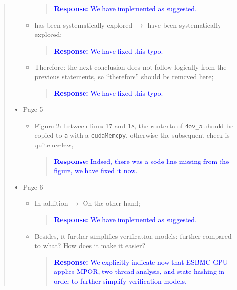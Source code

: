 \documentclass[11pt]{article}
\begin{document}
\begin{quote}
\begin{itemize}
\begin{itemize}
    \begin{quote}
    \textcolor{blue}{\textbf{Response:} We have implemented as suggested.}
    \end{quote}

  \item has been systematically explored $\rightarrow$ have been systematically explored;
  
    \begin{quote}
    \textcolor{blue}{\textbf{Response:} We have fixed this typo.}
    \end{quote}

  \item Therefore: the next conclusion does not follow logically from the previous statements, so ``therefore'' should be removed here;
  
    \begin{quote}
    \textcolor{blue}{\textbf{Response:} We have fixed this typo.}
    \end{quote}

  \end{itemize}
\item Page 5
  \begin{itemize}
  \item Figure 2: between lines 17 and 18, the contents of {\tt dev\_a} should be copied to {\tt a} with a {\tt cudaMemcpy}, otherwise the subsequent check is quite useless;
  
    \begin{quote}
    \textcolor{blue}{\textbf{Response:} Indeed, there was a code line missing from the figure, we have fixed it now.}
    \end{quote}

  \end{itemize}
\item Page 6
  \begin{itemize}
  \item In addition $\rightarrow$ On the other hand;
  
    \begin{quote}
    \textcolor{blue}{\textbf{Response:} We have implemented as suggested.}
    \end{quote}

  \item Besides, it further simplifies verification models: further compared to what? How does it make it easier?
  
    \begin{quote}
    \textcolor{blue}{\textbf{Response:} We explicitly indicate now that ESBMC-GPU applies MPOR, two-thread analysis, and state hashing in order to further simplify verification models.}
    \end{quote}


\end{itemize}
\end{itemize}
\end{quote}
\end{document}
